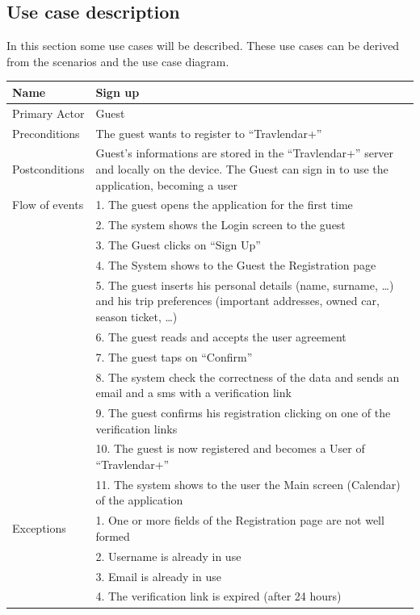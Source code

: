 \subsection*{Use case description}
In this section some use cases will be described. These use cases can be
derived from the scenarios and the use case diagram.
%
\begin{center}
\def\arraystretch{1.25}
  \begin{tabular}{ | l | p{} | }
    \hline
    Name & Sign up \\ \hline
    Primary Actor & Guest \\ \hline
    Preconditions & The guest wants to register to “Travlendar+” \\ \hline
    Postconditions & Guest's informations are stored in the “Travlendar+” server and locally on the device. The Guest can sign in to use the application, becoming a user \\ \hline
    Flow of events  & 1.	The guest opens the application for the first time \\
					& 2.	The system shows the Login screen to the guest \\
					& 3.	The Guest clicks on “Sign Up” \\
					& 4.	The System shows to the Guest the Registration page \\
					& 5.	The guest inserts his personal details (name, surname, …) and his trip preferences (important addresses, owned car, season ticket, …) \\
					& 6.	The guest reads and accepts the user agreement \\
					& 7.	The guest taps on “Confirm” \\
					& 8.	The system check the correctness of the data and sends an email and a sms with a verification link \\
					& 9.	The guest confirms his registration clicking on one of the verification links \\
					& 10.	The guest is now registered and becomes a User of “Travlendar+” \\
					& 11.	The system shows to the user the Main screen (Calendar) of the application \\ \hline    
    Exceptions  & 1.	One or more fields of the Registration page are not well formed \\
				& 2.	Username is already in use \\
				& 3.	Email is already in use \\
				& 4.	The verification link is expired (after 24 hours)\\ \hline
  \end{tabular}
\end{center}

